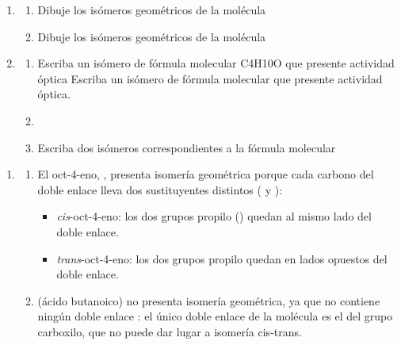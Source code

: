 \begin{exerciseEVAU}
    \begin{enumerate}[label=\letraminuscula]
        \item
        \begin{enumerate}[label=\letraminuscula]
            \item  Dibuje los isómeros geométricos de la molécula


            \item  Dibuje los isómeros geométricos de la molécula

        \end{enumerate}
        \item
        \begin{enumerate}[label=\letraminuscula]
            \item Escriba un isómero de fórmula molecular C4H10O que presente actividad óptica Escriba un isómero de fórmula molecular  que presente actividad óptica.
            \item
            \item Escriba dos isómeros correspondientes a la fórmula molecular 
        \end{enumerate}
    \end{enumerate}

    \begin{solu}
        \begin{enumerate}[label=\letraminuscula]
            \item
            \begin{enumerate}[label=\letraminuscula]
                \item El oct-4-eno, , presenta isomería geométrica porque cada carbono del doble enlace lleva dos sustituyentes distintos ( y ):
                \begin{itemize}
                    \item \emph{cis}-oct-4-eno: los dos grupos propilo () quedan al mismo lado del doble enlace.
                    \item \emph{trans}-oct-4-eno: los dos grupos propilo quedan en lados opuestos del doble enlace.
                \end{itemize}

                \item {} (ácido butanoico) no presenta isomería geométrica, ya que no contiene ningún doble enlace : el único doble enlace de la molécula es el  del grupo carboxilo, que no puede dar lugar a isomería cis-trans.
            \end{enumerate}


\end{enumerate}
\end{solu}
\end{exerciseEVAU}
